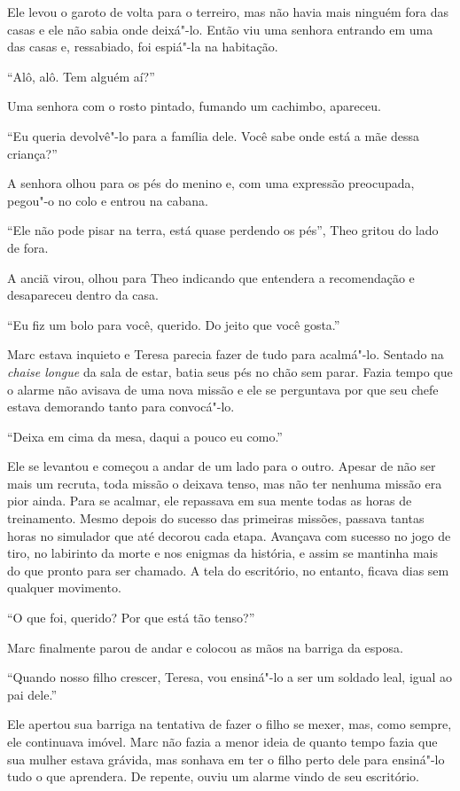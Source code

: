 Ele levou o garoto de volta para o terreiro, mas não havia mais ninguém
fora das casas e ele não sabia onde deixá"-lo. Então viu uma senhora
entrando em uma das casas e, ressabiado, foi espiá"-la na habitação.

``Alô, alô. Tem alguém aí?''

Uma senhora com o rosto pintado, fumando um cachimbo, apareceu.

``Eu queria devolvê"-lo para a família dele. Você sabe onde está a mãe
dessa criança?''

A senhora olhou para os pés do menino e, com uma expressão preocupada,
pegou"-o no colo e entrou na cabana.

``Ele não pode pisar na terra, está quase perdendo os pés'', Theo gritou
do lado de fora.

A anciã virou, olhou para Theo indicando que entendera a recomendação e
desapareceu dentro da casa.

\asterisc


``Eu fiz um bolo para você, querido. Do jeito que você gosta.''

Marc estava inquieto e Teresa parecia fazer de tudo para acalmá"-lo.
Sentado na \emph{chaise longue} da sala de estar, batia seus pés no chão
sem parar. Fazia tempo que o alarme não avisava de uma nova missão e ele
se perguntava por que seu chefe estava demorando tanto para convocá"-lo.

``Deixa em cima da mesa, daqui a pouco eu como.''

Ele se levantou e começou a andar de um lado para o outro. Apesar de não
ser mais um recruta, toda missão o deixava tenso, mas não ter nenhuma
missão era pior ainda. Para se acalmar, ele repassava em sua mente
todas as horas de treinamento. Mesmo depois do sucesso das primeiras
missões, passava tantas horas no simulador que até decorou cada etapa.
Avançava com sucesso no jogo de tiro, no labirinto da morte e nos
enigmas da história, e assim se mantinha mais do que pronto para ser
chamado. A tela do escritório, no entanto, ficava dias sem qualquer
movimento.

``O que foi, querido? Por que está tão tenso?''

Marc finalmente parou de andar e colocou as mãos na barriga da esposa.

``Quando nosso filho crescer, Teresa, vou ensiná"-lo a ser um soldado
leal, igual ao pai dele.''

Ele apertou sua barriga na tentativa de fazer o filho se mexer, mas,
como sempre, ele continuava imóvel. Marc não fazia a menor ideia de
quanto tempo fazia que sua mulher estava grávida, mas sonhava em ter
o filho perto dele para ensiná"-lo tudo o que aprendera. De repente,
ouviu um alarme vindo de seu escritório.

